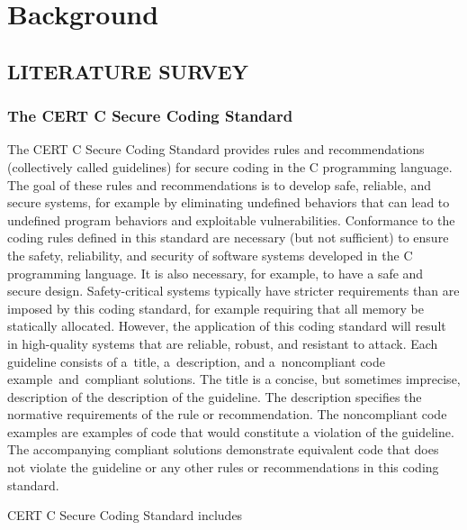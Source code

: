 
\chapter{Background}
\section{LITERATURE SURVEY}

 

\subsection{The CERT C Secure Coding Standard }
The CERT C Secure Coding Standard \cite{cert-c} provides rules and recommendations (collectively called guidelines) for secure coding in the C programming language. The goal of these rules and recommendations is to develop safe, reliable, and secure systems, for example by eliminating undefined behaviors that can lead to undefined program behaviors and exploitable vulnerabilities. Conformance to the coding rules defined in this standard are necessary (but not sufficient) to ensure the safety, reliability, and security of software systems developed in the C programming language. It is also necessary, for example, to have a safe and secure design. Safety-critical systems typically have stricter requirements than are imposed by this coding standard, for example requiring that all memory be statically allocated. However, the application of this coding standard will result in high-quality systems that are reliable, robust, and resistant to attack.
Each guideline consists of a title, a description, and a noncompliant code example and compliant solutions. The title is a concise, but sometimes imprecise, description of the description of the guideline. The description specifies the normative requirements of the rule or recommendation. The noncompliant code examples are examples of code that would constitute a violation of the guideline. The accompanying compliant solutions demonstrate equivalent code that does not violate the guideline or any other rules or recommendations in this coding standard.

CERT C Secure Coding Standard includes

